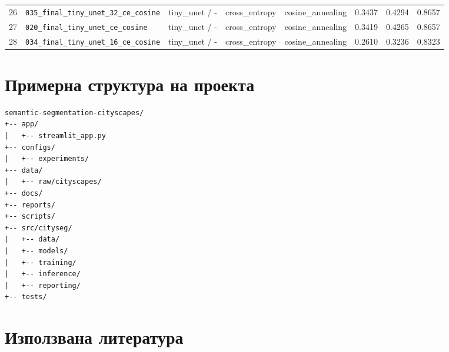 \documentclass[12pt,a4paper]{article}
\begin{document}
\begin{landscape}
\begin{longtable}{r p{7.0cm} p{4.2cm} p{3.0cm} p{3.2cm} r r r}
26 & \texttt{035\_final\_tiny\_unet\_32\_ce\_cosine} & tiny\_unet / - & cross\_entropy & cosine\_annealing & 0.3437 & 0.4294 & 0.8657 \\
27 & \texttt{020\_final\_tiny\_unet\_ce\_cosine} & tiny\_unet / - & cross\_entropy & cosine\_annealing & 0.3419 & 0.4265 & 0.8657 \\
28 & \texttt{034\_final\_tiny\_unet\_16\_ce\_cosine} & tiny\_unet / - & cross\_entropy & cosine\_annealing & 0.2610 & 0.3236 & 0.8323 \\

\bottomrule
\end{longtable}
\endgroup
\end{landscape}


\section{Примерна структура на проекта}

\begin{verbatim}
semantic-segmentation-cityscapes/
+-- app/
|   +-- streamlit_app.py
+-- configs/
|   +-- experiments/
+-- data/
|   +-- raw/cityscapes/
+-- docs/
+-- reports/
+-- scripts/
+-- src/cityseg/
|   +-- data/
|   +-- models/
|   +-- training/
|   +-- inference/
|   +-- reporting/
+-- tests/
\end{verbatim}

\section{Използвана литература}
\end{document}
